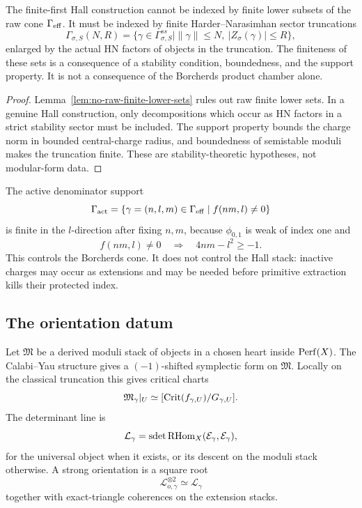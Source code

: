 \begin{corollary}
\label{cor:finite-first-means-hn-first}
The finite-first Hall construction cannot be indexed by finite lower
subsets of the raw cone \(\Gamma_{\mathrm{eff}}\).  It must be indexed by finite
Harder--Narasimhan sector truncations
\[
  \Gamma_{\sigma,S}(N,R)
  =
  \{\gamma\in\Gamma^{ss}_{\sigma,S}\mid
  \|\gamma\|\le N,\ |Z_\sigma(\gamma)|\le R\},
\]
enlarged by the actual HN factors of objects in the truncation.  The
finiteness of these sets is a consequence of a stability condition,
boundedness, and the support property.  It is not a consequence of the
Borcherds product chamber alone.
\end{corollary}

\begin{proof}
Lemma~\ref{lem:no-raw-finite-lower-sets} rules out raw finite lower
sets.  In a genuine Hall construction, only decompositions which occur
as HN factors in a strict stability sector must be included.  The
support property bounds the charge norm in bounded central-charge
radius, and boundedness of semistable moduli makes the truncation
finite.  These are stability-theoretic hypotheses, not modular-form
data.
\end{proof}

\begin{remark}
The active denominator support
\[
  \Gamma_{\mathrm{act}}=\{\gamma=(n,l,m)\in\Gamma_{\mathrm{eff}}\mid f(nm,l)\ne0\}
\]
is finite in the \(l\)-direction after fixing \(n,m\), because
\(\phi_{0,1}\) is weak of index one and
\[
  f(nm,l)\ne0\quad\Longrightarrow\quad 4nm-l^2\ge -1.
\]
This controls the Borcherds cone.  It does not control the Hall stack:
inactive charges may occur as extensions and may be needed before
primitive extraction kills their protected index.
\end{remark}

\subsection{The orientation datum}

Let \(\mathfrak M\) be a derived moduli stack of objects in a chosen
heart inside \(\operatorname{Perf}(X)\).  The Calabi--Yau structure gives a
\((-1)\)-shifted symplectic form on \(\mathfrak M\).  Locally on the
classical truncation this gives critical charts
\[
  \mathfrak M_\gamma|_U\simeq [\operatorname{Crit}(f_{\gamma,U})/G_{\gamma,U}].
\]
The determinant line is
\[
  \mathcal L_\gamma
  =
  \operatorname{sdet}\operatorname{RHom}_X(\mathcal E_\gamma,\mathcal E_\gamma),
\]
for the universal object when it exists, or its descent on the moduli
stack otherwise.  A strong orientation is a square root
\[
  \mathscr L_{o,\gamma}^{\otimes2}\simeq\mathcal L_\gamma
\]
together with exact-triangle coherences on the extension stacks.

